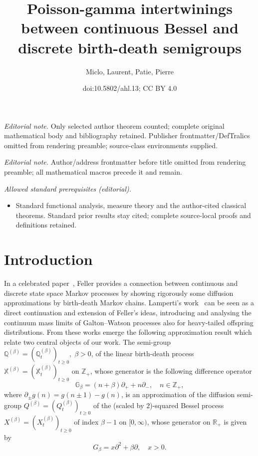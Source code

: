 \documentclass[10pt]{amsart}
\title{Poisson-gamma intertwinings between continuous Bessel and discrete birth-death semigroups}
\author{Miclo, Laurent, Patie, Pierre}
\date{doi:10.5802/ahl.13; CC BY 4.0}
\theoremstyle{definition}\newtheorem{defi}[theo]{Definition}\newtheorem{rema}[theo]{Remark}\newtheorem{exam}[theo]{Example}\newtheorem{exem}[theo]{Example}\newtheorem{nota}[theo]{Notation}
\newcommand{\RR}{\mathbb{R}}
\newcommand{\ZZ}{\mathbb{Z}}
\newcommand{\pa}{\partial}
\newcommand{\Bg}{G}
\newcommand{\discret}[1]{\mathds{#1}}
\newcommand{\cont}[1]{{#1}}
\begin{document}
\maketitle
\noindent\textit{Editorial note.} Only selected author theorem counted; complete original mathematical body and bibliography retained. Publisher frontmatter/DefTralics omitted from rendering preamble; source-class environments supplied.\par\medskip
\noindent\textit{Editorial note.} Author/address frontmatter before title omitted from rendering preamble; all mathematical macros precede it and remain.\par\medskip
\noindent\textit{Allowed standard prerequisites (editorial).}\begin{itemize}
\item Standard functional analysis, measure theory and the author-cited classical theorems. Standard prior results stay cited; complete source-local proofs and definitions retained.
\end{itemize}\medskip
\section{Introduction}

In a celebrated paper~\cite{Feller-Gen}, Feller provides a connection between continuous and discrete state space Markov processes by showing rigorously some diffusion approximations by birth-death Markov chains. Lamperti's work~\cite{Lamperti-67b} can be seen as a direct continuation and extension of Feller's ideas, introducing and analysing the continuum mass limits of Galton--Watson processes also for heavy-tailed offspring distributions. From these works emerge the following approximation result which relate two central objects of our work. The semi-group $\discret{Q}^{(\beta)}=(\discret{Q}^{(\beta)}_t)_{t\geq 0},\; \beta>0$, of the linear birth-death process $\discret{X}^{(\beta)}=(\discret{X}^{(\beta)}_t)_{t\geq 0}$ on $\ZZ_+$, whose generator is the following difference operator
\begin{equation*}
\discret{G}_{\beta}=(n+\beta) \pa_+ + n\pa_-,\quad n\in \ZZ_+,
\end{equation*}
where $\pa_{\pm}g(n)=g(n\pm 1)-g(n)$, is an approximation of the diffusion semi-group $\cont{Q}^{(\beta)}=(\cont{Q}^{(\beta)}_t)_{t\geq 0}$ of the (scaled by $2$)-squared Bessel process $\cont{X}^{(\beta)}=(\cont{X}^{(\beta)}_t)_{t\geq 0}$ of index $\beta-1$ on $[0,\infty)$, whose generator on $\RR_+$ is given by
\[
\Bg_{\beta}=x\pa^2+\beta\pa, \quad x>0.
\]
\end{document}
